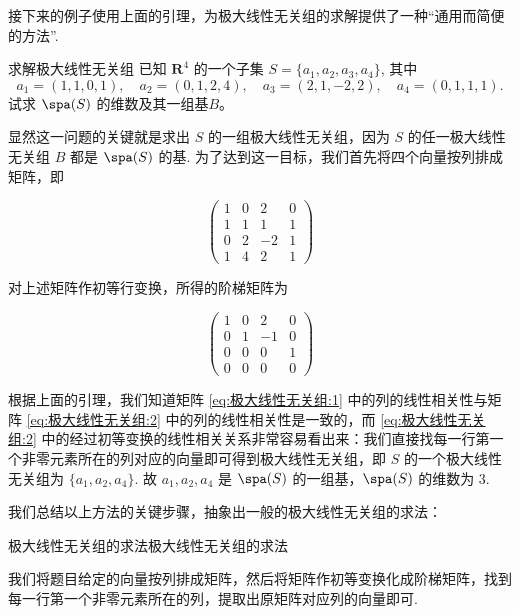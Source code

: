 接下来的例子使用上面的引理，为极大线性无关组的求解提供了一种``通用而简便的方法''.

\begin{example}{}{求解极大线性无关组}
    已知 $\mathbf{R}^4$ 的一个子集 $S = \{a_1, a_2, a_3, a_4\}$, 其中
    \[
        a_1 = (1,1,0,1), \quad a_2 = (0,1,2,4), \quad
        a_3 = (2,1,-2,2), \quad a_4 = (0,1,1,1).
    \]
    试求 $\spa(S)$ 的维数及其一组基$B$。
\end{example}

\begin{solution}

    显然这一问题的关键就是求出 $S$ 的一组极大线性无关组，因为 $S$ 的任一极大线性无关组 $B$ 都是 $\spa(S)$ 的基. 为了达到这一目标，我们首先将四个向量按列排成矩阵，即

    \begin{equation} \label{eq:极大线性无关组:1}
        \begin{pmatrix}
            1 & 0 & 2  & 0 \\
            1 & 1 & 1  & 1 \\
            0 & 2 & -2 & 1 \\
            1 & 4 & 2 & 1
        \end{pmatrix}
    \end{equation}

    对上述矩阵作初等行变换，所得的阶梯矩阵为

    \begin{equation} \label{eq:极大线性无关组:2}
        \begin{pmatrix}
            1 & 0 & 2  & 0 \\
            0 & 1 & -1 & 0 \\
            0 & 0 & 0  & 1 \\
            0 & 0 & 0  & 0
        \end{pmatrix}
    \end{equation}

    根据上面的引理，我们知道矩阵 \eqref{eq:极大线性无关组:1} 中的列的线性相关性与矩阵 \eqref{eq:极大线性无关组:2} 中的列的线性相关性是一致的，而 \eqref{eq:极大线性无关组:2} 中的经过初等变换的线性相关关系非常容易看出来：我们直接找每一行第一个非零元素所在的列对应的向量即可得到极大线性无关组，即 $S$ 的一个极大线性无关组为 $\{a_1, a_2, a_4\}$. 故 $a_1, a_2, a_4$ 是 $\spa(S)$ 的一组基，$\spa(S)$ 的维数为 3.
\end{solution}

我们总结以上方法的关键步骤，抽象出一般的极大线性无关组的求法：
\begin{lemma}{极大线性无关组的求法}{极大线性无关组的求法}

    我们将题目给定的向量按列排成矩阵，然后将矩阵作初等变换化成阶梯矩阵，找到每一行第一个非零元素所在的列，提取出原矩阵对应列的向量即可.
\end{lemma}

